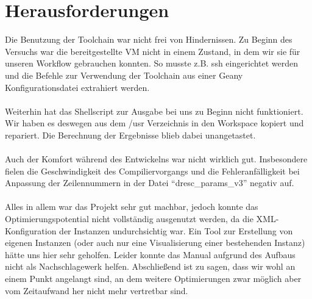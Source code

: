 \documentclass[oneside,11pt,accentcolor=tud2b, nochapname]{tudexercise}
\begin{document}
\section*{Herausforderungen}

Die Benutzung der Toolchain war nicht frei von Hindernissen.
Zu Beginn des Versuchs war die bereitgestellte VM nicht in einem Zustand, in dem wir sie für unseren Workflow gebrauchen konnten.
So musste z.B. ssh eingerichtet werden und die Befehle zur Verwendung der Toolchain aus einer Geany Konfigurationsdatei extrahiert werden.\\
\\
Weiterhin hat das Shellscript zur Ausgabe bei uns zu Beginn nicht funktioniert. 
Wir haben es deswegen aus dem /usr Verzeichnis in den Workspace kopiert und repariert.
Die Berechnung der Ergebnisse blieb dabei unangetastet.\\
\\
Auch der Komfort während des Entwickelns war nicht wirklich gut.
Insbesondere fielen die Geschwindigkeit des Compiliervorgangs und die Fehleranfälligkeit bei Anpassung der Zeilennummern in der Datei "`dresc\_params\_v3"' negativ auf.\\
\\
Alles in allem war das Projekt sehr gut machbar, jedoch konnte das Optimierungspotential nicht vollständig ausgenutzt werden, da die XML-Konfiguration der Instanzen undurchsichtig war.
Ein Tool zur Erstellung von eigenen Instanzen (oder auch nur eine Visualisierung einer bestehenden Instanz) hätte uns hier sehr geholfen.
Leider konnte das Manual aufgrund des Aufbaus nicht als Nachschlagewerk helfen.
Abschließend ist zu sagen, dass wir wohl an einem Punkt angelangt sind, an dem weitere Optimierungen zwar möglich aber vom Zeitaufwand her nicht mehr vertretbar sind.
\end{document}
